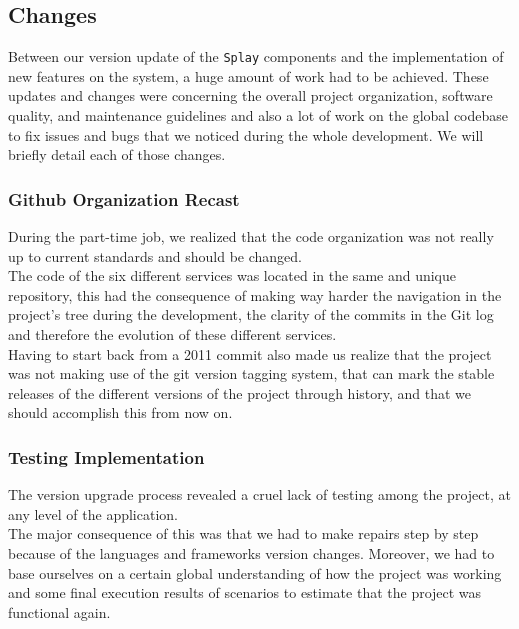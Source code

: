 \documentclass{eplmastersthesis}
\begin{document}
      \subsection{Changes}

        Between our version update of the \texttt{Splay} components and the
        implementation of new features on the system, a huge amount of
        work had to be achieved. These updates and changes were concerning
        the overall project organization, software quality, and maintenance
        guidelines and also a lot of work on the global codebase to fix
        issues and bugs that we noticed during the whole development.
        We will briefly detail each of those changes.

        \subsubsection{Github Organization Recast}

          During the part-time job, we realized that the code organization
          was not really up to current standards and should be changed.\\
          The code of the six different services was located in the same and
          unique repository, this had the consequence of making way harder
          the navigation in the project's tree during the development, the
          clarity of the commits in the Git log and therefore the evolution
          of these different services.\\

          Having to start back from a 2011 commit also made us realize that the
          project was not making use of the git version tagging system, that
          can mark the stable releases of the different versions of the project
          through history, and that we should accomplish this from now on.

        \subsubsection{Testing Implementation}

          The version upgrade process revealed a cruel lack of testing among
          the project, at any level of the application.\\
          The major consequence of this was that we had to make repairs
          step by step because of the languages and frameworks version changes.
          Moreover, we had to base ourselves on a certain global understanding
          of how the project was working and some final execution results of
          scenarios to estimate that the project was functional again.\\
\end{document}
